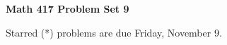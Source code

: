 \documentclass[12pt]{article}
\begin{document}
\def\ctln{\centerline}
\def\msk{\medskip}
\def\bsk{\bigskip}
\def\ssk{\smallskip}
\def\hsk{\hskip.3in}
\def\ra{\rightarrow}
\def\ubr{\underbar}

\def\mt{{\mathcal T}}
\def\mb{{\mathcal B}}
\def\ms{{\mathcal S}}
\def\mu{{\mathcal U}}
\def\mv{{\mathcal V}}

\def\bbr{{\mathbb R}}
\def\bbz{{\mathbb Z}}
\def\bbq{{\mathbb Q}}
\def\spc{$~$\hskip.15in$~$}

\def\sset{\subseteq}
\def\del{\partial}
\def\lra{$\Leftrightarrow$}
\def\bra{$\Rightarrow$}




\ctln{\bf Math 417 Problem Set 9}

\msk

Starred (*) problems are due Friday, November 9.
\end{document}
